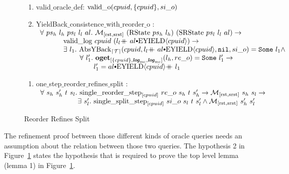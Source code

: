 \begin{figure}
\noindent{}
\begin{enumerate}
\item valid$\_$oracle$\_$def: ${\mathrm{valid}\_\mathrm{o}}({cpuid}, {\{cpuid\}}, {si\_o })$
\item YieldBack$\_$consistence$\_$with$\_$reorder$\_$o :\\
$
\begin{array}{l}
\forall \ ps_h \ l_h \ ps_l \ l_l \ al.\ \matchrstatesrstate{(\rstate{ps_h}{l_h})}{(\srstate{ps_l}{l_l}{al})} \rightarrow \\
\ \ \ \ \ \ \ \ \ \ \validlog{cpuid}{(\listconsoppo{\yieldev{cpuid}}{\listappoppo{al}{l_l}})} \rightarrow \\
\ \ \ \ \ \ \ \ \ \ \exists\ l_1. \ \yieldbackfunc{\timebound}{cpuid}{\listconsoppo{\yieldev{cpuid}}{\listappoppo{al}{l_l}}}{\nulllist}{si\_o}{l_1} \wedge \\ 
\ \ \ \ \ \ \ \ \ \ \ \ \ \ \ \ \ \forall \ l_1' .\  \oget{\set{cpuid}}{\mclog}{\mclog}{l_h}{re\_o}{l_1'} \rightarrow \\ 
\ \ \ \ \ \ \ \ \ \ \ \ \ \ \ \ \  \ \ \ \ \ \ l_1' = \listappoppo{l_1}{\listconsoppo{\yieldev{cpuid}}{al}} \\
\end{array}
$
\end{enumerate}

\noindent{}
\begin{enumerate}
\item one$\_$step$\_$reorder$\_$refines$\_$split : \\
$
\begin{array}{l}
\forall \ s_h \ s_h' \ t \ s_l . \ \singlereorderstep{cpuid}{re\_o}{s_h}{t}{s_h'} \rightarrow  \matchrstatesrstate{s_h}{s_l} \rightarrow \\
\ \ \ \ \ \ \ \ \ \ \ \ \ \ \ \ \exists\ s_l' .\ \singlesplitstep{cpuid}{si\_o}{s_l}{t}{s_l'} \wedge  \matchrstatesrstate{s_h'}{s_l'}\\
\end{array}
$
\end{enumerate}
\caption{Reorder Refines Split}
\label{fig:chapter:conlink:reorder-refines-split}
\end{figure}
The refinement proof between those different kinds of oracle queries needs an assumption about the relation between those two queries. 
The hypothesis 2 in Figure~\ref{fig:chapter:conlink:reorder-refines-split} 
states the hypothesis that is 
required to prove the top level lemma (lemma 1) in Figure~\ref{fig:chapter:conlink:reorder-refines-split}.


